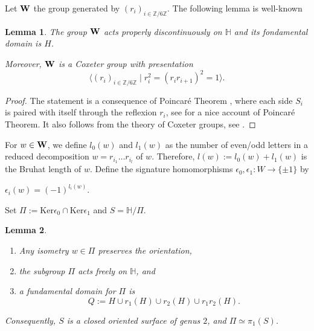 \documentclass[12pt]{amsart}
\newcommand{\HP}{\mathbb{H}}
\newcommand{\Z}{\mathbb{Z}}
\newcommand{\Ker}{\mathrm{Ker}}
\newtheorem{lemma}{Lemma}
\begin{document}
Let ${\bf W}$ the group generated by $(r_i)_{i\in\Z/6\Z}$.
The following lemma is well-known

\begin{lemma} 
The group ${\bf W}$ acts properly discontinuously
on $\HP$ and its fondamental domain is $H$.

Moreover, ${\bf W}$ is a Coxeter group with presentation
$$\langle (r_i)_{i\in\Z/6\Z} \mid 
r_i^2=
(r_i r_{i+1})^2=1\rangle.$$
\end{lemma}

\begin{proof} The statement is a consequence of Poincar\'e
Theorem \cite{Poincare}, where each side $S_i$ is paired with itself through the
reflexion $r_i$, see \cite{Maskit} for a  nice account of
Poincar\'e Theorem. It also follows from the theory of Coxeter groups, see
\cite{Davis}.
\end{proof}






For $w\in {\bf W}$, we define $l_0(w)$ and $l_1(w)$ as  the number of  even/odd letters in a reduced decomposition $w=r_{i_1}\dots r_{i_l}$ of $w$. Therefore,
$l(w):=l_0(w)+l_1(w)$ is the Bruhat length of $w$. Define the signature homomorphisms
$\epsilon_0, \epsilon_1:W\to\{\pm 1\}$ by 

\centerline{$\epsilon_i(w)=(-1)^{l_i(w)}$.}

Set  $\Pi:=\Ker\epsilon_0\cap\Ker\epsilon_1$ and $S=\HP/\Pi$.

\begin{lemma} \label{fundamental}

\begin{enumerate}
\item[(a)] Any isometry $w\in \Pi$ preserves the orientation,
\item[(b)] the subgroup $\Pi$ acts freely on $\HP$, and 
\item[(c)] a  fundamental domain for $\Pi$ is 
$$Q:= H\cup r_1(H)\cup r_2(H)\cup r_1r_2(H).$$
\end{enumerate}

Consequently, $S$ is a closed oriented surface of genus $2$, and
$\Pi\simeq \pi_1(S)$.
\end{lemma}
\end{document}
